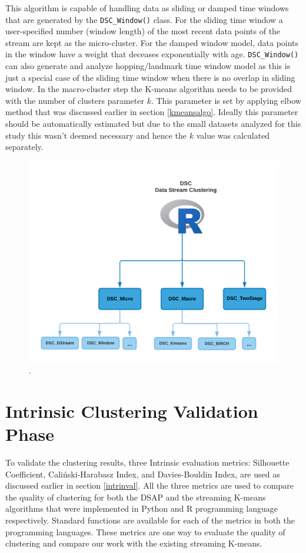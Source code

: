 \documentclass[../UNBThesis2.tex]{subfiles}
\begin{document}
This algorithm is capable of handling data as sliding or damped time windows that are generated by the \texttt{DSC\_Window()} class. For the sliding time window a user-specified number (window length) of the most recent data points of the stream are kept as the micro-cluster. For the damped window model, data points in the window have a weight that deceases exponentially with age. \texttt{DSC\_Window()} can also generate and analyze hopping/landmark time window model as this is just a special case of the sliding time window when there is no overlap in sliding window. In the macro-cluster step the K-means algorithm needs to be provided with the number of clusters parameter $k$. This parameter is set by applying elbow method that was discussed earlier in section \ref{kmeansalgo}. Ideally this parameter should be automatically estimated but due to the small datasets analyzed for this study this wasn't deemed necessary and hence the $k$ value was calculated separately.

\begin{figure}[]
    \centering
    \includegraphics[width=.7\textwidth]{image/Chapters/Chapter5/DSC_all.png}
    \caption{ .}
    \label{dsc}
\end{figure}




\section{Intrinsic Clustering Validation Phase}
To validate the clustering results, three Intrinsic evaluation metrics: Silhouette Coefficient, Caliński-Harabasz Index, and Davies-Bouldin Index, are used as discussed earlier in section \ref{intrinval}. All the three metrics are used to compare the quality of clustering for both the DSAP and the streaming K-means algorithms that were implemented in Python and R programming language  respectively. Standard functions are available for each of the metrics in both the programming languages. These metrics are one way to evaluate the quality of clustering and compare our work with the existing streaming K-means.
\end{document}
